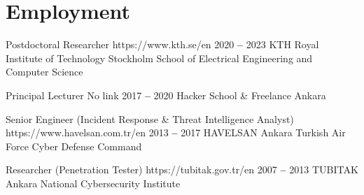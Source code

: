 

\section{Employment}

  
    \itemizeCVBegin[nolabel]{}
    
        \bTitleYearOrgLinkPlace
            {Postdoctoral Researcher}
            {https://www.kth.se/en}
            {2020 \textbf{--} 2023}
            {KTH Royal Institute of Technology}
            {Stockholm}
            \small School of Electrical Engineering and Computer Science
            
        \bTitleYearOrgLinkPlace
            {Principal Lecturer}
            {No link}
            {2017 \textbf{--} 2020}
            {Hacker School \& Freelance}
            {Ankara}
            \small

        \bTitleYearOrgLinkPlace
            {Senior Engineer (Incident Response \& Threat Intelligence Analyst)}
            {https://www.havelsan.com.tr/en}
            {2013 \textbf{--} 2017}
            {HAVELSAN}
            {Ankara}
            \small Turkish Air Force Cyber Defense Command

        \bTitleYearOrgLinkPlace
            {Researcher (Penetration Tester)}
            {https://tubitak.gov.tr/en}
            {2007 \textbf{--} 2013}
            {TUBITAK}
            {Ankara}
            \small National Cybersecurity Institute

    \itemizeCVEnd